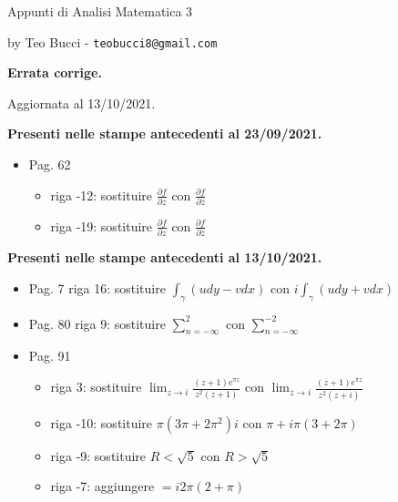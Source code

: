 \documentclass[10pt,a4paper]{article}
\begin{document}

{\Huge {Appunti di Analisi Matematica 3}} %

\vspace*{0.2cm}

by Teo Bucci - \texttt{teobucci8@gmail.com}

\vspace*{0.5cm}

{\Large \textbf{Errata corrige.}}

\vspace*{0.5cm}

Aggiornata al 13/10/2021.

\vspace*{0.5cm}


\textbf{Presenti nelle stampe antecedenti al 23/09/2021.}
\begin{itemize}
	\item Pag. 62
	\begin{itemize}
		\item riga -12: sostituire $\frac{\partial f}{\partial z}$ con $\frac{\partial f}{\partial \overline{z}}$
		\item riga -19: sostituire $\frac{\partial f}{\partial z}$ con $\frac{\partial f}{\partial \overline{z}}$
	\end{itemize}
\end{itemize}


\textbf{Presenti nelle stampe antecedenti al 13/10/2021.}
\begin{itemize}
	\item Pag. 7 riga 16: sostituire $\int _{\gamma }( udy-vdx)$ con $i\int _{\gamma }( udy+vdx)$
	\item Pag. 80 riga 9: sostituire $\sum ^{2}_{n=-\infty }$ con $\sum ^{-2}_{n=-\infty }$
	\item Pag. 91
	\begin{itemize}
		\item riga 3: sostituire $\lim _{z\rightarrow i}\frac{\left( z+1\right) e^{\pi z}}{z^{2}\left( z+1\right)}$ con $\lim _{z\rightarrow i}\frac{\left( z+1\right) e^{\pi z}}{z^{2}\left( z+i\right)}$
		\item riga -10: sostituire $\pi \left( 3\pi +2\pi ^{2}\right) i$ con $\pi +i\pi \left( 3 +2\pi\right)$
		\item riga -9: sostituire $R< \sqrt{5}$ con $R> \sqrt{5}$
		\item riga -7: aggiungere $= i2\pi (2+\pi )$
	\end{itemize}
\end{itemize}
\end{document}
